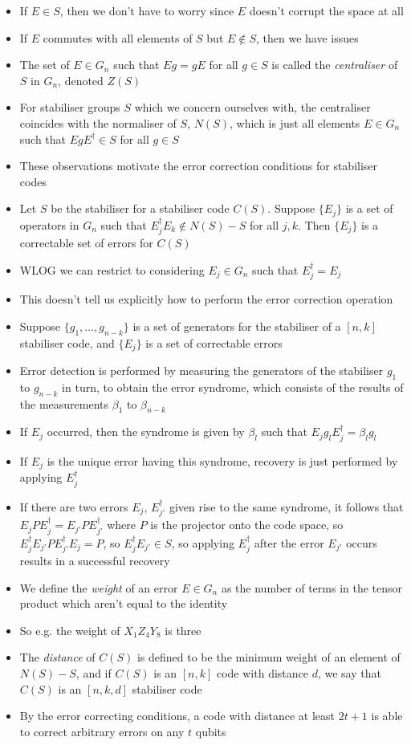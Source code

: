\documentclass[12pt,a4paper]{article}
\numberwithin{equation}{section}
\begin{document}
\begin{itemize}
		\item If $E\in S$, then we don't have to worry since $E$ doesn't corrupt the space at all
		\item If $E$ commutes with all elements of $S$ but $E\notin S$, then we have issues
		\item The set of $E\in G_{n}$ such that $Eg=gE$ for all $g\in S$ is called the \textit{centraliser} of $S$ in $G_{n}$, denoted $Z(S)$
		\item For stabiliser groups $S$ which we concern ourselves with, the centraliser coincides with the normaliser of $S$, $N(S)$, which is just all elements $E\in G_{n}$ such that $EgE^{\dagger}\in S$ for all $g\in S$
		\item These observations motivate the error correction conditions for stabiliser codes
		\item Let $S$ be the stabiliser for a stabiliser code $C(S)$. Suppose $\{E_{j}\}$ is a set of operators in $G_{n}$ such that $E_{j}^{\dagger}E_{k}\notin N(S)-S$ for all $j,k$. Then $\{E_{j}\}$ is a correctable set of errors for $C(S)$
		\item WLOG we can restrict to considering $E_{j}\in G_{n}$ such that $E_{j}^{\dagger}=E_{j}$
		\item This doesn't tell us explicitly how to perform the error correction operation
		\item Suppose $\{g_{1},\ldots, g_{n-k}\}$ is a set of generators for the stabiliser of a $[n,k]$ stabiliser code, and $\{E_{j}\}$ is a set of correctable errors
		\item Error detection is performed by measuring the generators of the stabiliser $g_{1}$ to $g_{n-k}$ in turn, to obtain the error syndrome, which consists of the results of the measurements $\beta_{1}$ to $\beta_{n-k}$
		\item If $E_{j}$ occurred, then the syndrome is given by $\beta_{l}$ such that $E_{j}g_{l}E_{j}^{\dagger}=\beta_{l}g_{l}$
		\item If $E_{j}$ is the unique error having this syndrome, recovery is just performed by applying $E_{j}^{\dagger}$
		\item If there are two errors $E_{j}$, $E_{j'}^{\dagger}$ given rise to the same syndrome, it follows that $E_{j}PE_{j}^{\dagger}=E_{j'}PE_{j'}^{\dagger}$ where $P$ is the projector onto the code space, so $E_{j}^{\dagger}E_{j'}PE_{j'}^{\dagger}E_{j}=P$, so $E_{j}^{\dagger}E_{j'}\in S$, so applying $E_{j}^{\dagger}$ after the error $E_{j'}$ occurs results in a successful recovery
		\item We define the \textit{weight} of an error $E\in G_{n}$ as the number of terms in the tensor product which aren't equal to the identity
		\item So e.g. the weight of $X_{1}Z_{4}Y_{8}$ is three
		\item The \textit{distance} of $C(S)$ is defined to be the minimum weight of an element of $N(S)-S$, and if $C(S)$ is an $[n,k]$ code with distance $d$, we say that $C(S)$ is an $[n,k,d]$ stabiliser code
		\item By the error correcting conditions, a code with distance at least $2t+1$ is able to correct arbitrary errors on any $t$ qubits
	\end{itemize}
\end{document}
